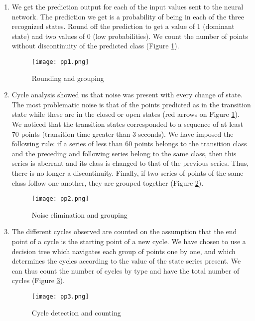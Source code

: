 \documentclass[12pt, letterpaper]{article}
\begin{document}
\begin{enumerate}
    \item We get the prediction output for each of the input values sent to the neural network. The  prediction we get is a probability of being in each of the three recognized states. Round off the prediction to get a value of 1 (dominant state) and two values of 0 (low probabilities). We count the number of points without discontinuity of the predicted class (Figure \ref{fig:pp1}).
    \begin{figure}[H]
        \centering
        \texttt{[image: pp1.png]}
        \caption{Rounding and grouping}
        \label{fig:pp1}
    \end{figure}
    \item Cycle analysis showed us that noise was present with every change of state. The most problematic noise is that of the points predicted as in the transition state while these are in the closed or open states (red arrows on Figure \ref{fig:pp1}). We noticed that the transition states corresponded to a sequence of at least 70 points (transition time greater than 3 seconds). We have imposed the following rule: if a series of less than 60 points belongs to the transition class and the preceding and following series belong to the same class, then this series is aberrant and its class is changed to that of the previous series. Thus, there is no longer a discontinuity. Finally, if two series of points of the same class follow one another, they are grouped together (Figure \ref{fig:pp2}).
    \begin{figure}[H]
        \centering
        \texttt{[image: pp2.png]}
        \caption{Noise elimination and grouping}
        \label{fig:pp2}
    \end{figure}
    \item The different cycles observed are counted on the assumption that the end point of a cycle is the starting point of a new cycle. We have chosen to use a decision tree which navigates each group of points one by one, and which determines the cycles according to the value of the state series present. We can thus count the number of cycles by type and have the total number of cycles (Figure \ref{fig:pp3}).
    \begin{figure}[H]
        \centering
        \texttt{[image: pp3.png]}
        \caption{Cycle detection and counting}
        \label{fig:pp3}
    \end{figure}
\end{enumerate}
\end{document}
